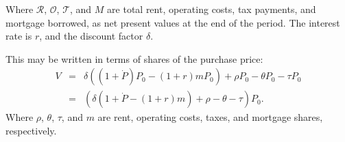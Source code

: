 Where $\mathcal{R}$, $\mathcal{O}$, $\mathcal{T}$, and $M$ are total rent, operating costs, tax payments, and mortgage borrowed, as net present values at the end of the period. The interest rate is $r$, and the discount factor $\delta$. %

 This may be written in terms of shares of the purchase price:
\begin{eqnarray}
V &=& \delta \left((1+\dot P) P_0 - (1+r)mP_0\right) + \rho P_0 - \theta P_0 - \tau P_0 \nonumber \\
  &=& \left(\delta \left(1+\dot P - (1+r)m   \right) + \rho     - \theta     - \tau\right) P_0.
\label{eqn-property-investment-value2}
\end{eqnarray}
 Where $\rho$, $\theta$, $\tau$, and $m$ are rent, operating costs, taxes, and mortgage shares, respectively. %


